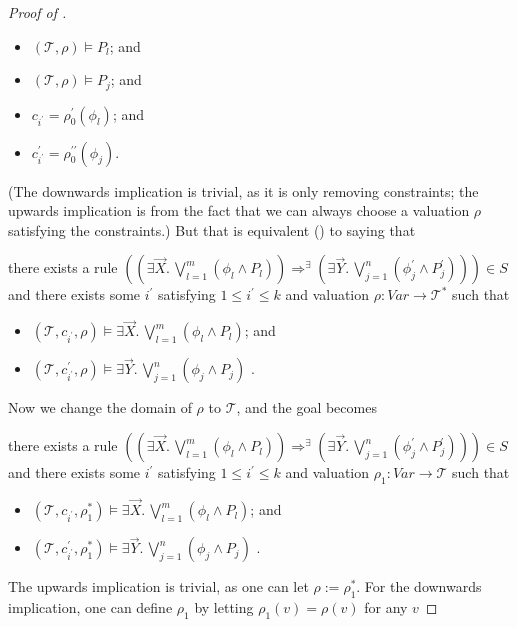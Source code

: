 \documentclass{article}
\newenvironment{proofenv}
  {
    \VerbatimEnvironment\begin{tcolorbox}[colback=black!0!white] %
  }
  {
   \end{tcolorbox}
  }
\begin{document}
\begin{proof}[Proof of ]
\begin{proofenv}
\begin{itemize}
    \item $(\mathcal{T}, \rho) \vDash P_l$; and
    \item $(\mathcal{T}, \rho) \vDash P_j$; and
    \item $c_{i^\prime} = \rho_0^\prime(\phi_l)$; and
    \item $c^\prime_{i^\prime} = \rho_0^{\prime\prime}(\phi_j)$.
\end{itemize}
\end{proofenv}
(The downwards implication is trivial, as it is only removing constraints; the upwards implication
is from the fact that we can always choose a valuation $\rho$ satisfying the constraints.)
But that is equivalent () to saying that 
\begin{proofenv}
there exists a rule $((\exists \vec{X}.\, \bigvee_{l=1}^{m} (\phi_l \land P_l)) \Rightarrow^\exists (\exists \vec{Y}.\, \bigvee_{j=1}^{n} (\phi^\prime_j \land P^\prime_j))) \in S$
and there exists some $i^\prime$ satisfying $1 \leq i^\prime \leq k$
and valuation $\rho : \mathit{Var} \to \mathcal{T}^*$ such that
\begin{itemize}
    \item $(\mathcal{T}, c_{i^\prime}, \rho) \vDash \exists \vec{X}.\, \bigvee_{l=1}^{m} (\phi_l \land P_l)$; and
    \item $(\mathcal{T}, c^\prime_{i^\prime}, \rho) \vDash \exists \vec{Y}.\, \bigvee_{j=1}^{n} (\phi_j \land P_j)$
    .
\end{itemize}
\end{proofenv}
Now we change the domain of $\rho$ to $\mathcal{T}$, and the goal becomes
\begin{proofenv}
there exists a rule $((\exists \vec{X}.\, \bigvee_{l=1}^{m} (\phi_l \land P_l)) \Rightarrow^\exists (\exists \vec{Y}.\, \bigvee_{j=1}^{n} (\phi^\prime_j \land P^\prime_j))) \in S$
and there exists some $i^\prime$ satisfying $1 \leq i^\prime \leq k$
and valuation $\rho_1 : \mathit{Var} \to \mathcal{T}$ such that
\begin{itemize}
    \item $(\mathcal{T}, c_{i^\prime}, \rho_1^*) \vDash \exists \vec{X}.\, \bigvee_{l=1}^{m} (\phi_l \land P_l)$; and
    \item $(\mathcal{T}, c^\prime_{i^\prime}, \rho_1^*) \vDash \exists \vec{Y}.\, \bigvee_{j=1}^{n} (\phi_j \land P_j)$
    .
\end{itemize}
\end{proofenv}
The upwards implication is trivial, as one can let $\rho := \rho_1^*$.
For the downwards implication, one can define $\rho_1$ by letting $\rho_1(v) = \rho(v)$ for any $v$

\end{proof}
\end{document}
